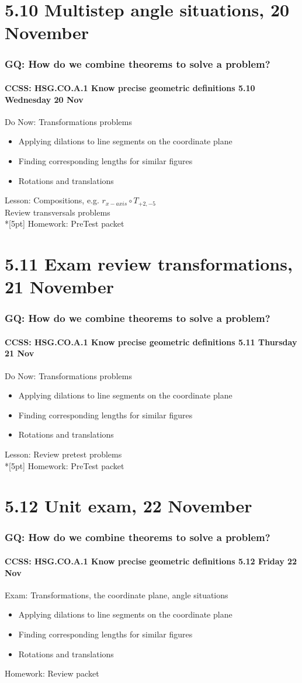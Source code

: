 \documentclass{beamer}
\begin{document}
\section{5.10 Multistep angle situations, 20 November}
\frame
{
  \frametitle{GQ: How do we combine theorems to solve a problem?}
  \framesubtitle{CCSS: HSG.CO.A.1 Know precise geometric definitions \hfill \alert{5.10 Wednesday 20 Nov}}

  \begin{block}{Do Now: Transformations problems}
  \begin{itemize}
    \item Applying dilations to line segments on the coordinate plane
    \item Finding corresponding lengths for similar figures
    \item Rotations and translations
  \end{itemize}
  \end{block}
  Lesson: Compositions, e.g. $r_{x-axis} \circ T_{+2,-5}$\\
  Review transversals problems \\*[5pt]
  Homework: PreTest packet 
}

\section{5.11 Exam review transformations, 21 November}
\frame
{
  \frametitle{GQ: How do we combine theorems to solve a problem?}
  \framesubtitle{CCSS: HSG.CO.A.1 Know precise geometric definitions \hfill \alert{5.11 Thursday 21 Nov}}

  \begin{block}{Do Now: Transformations problems}
  \begin{itemize}
    \item Applying dilations to line segments on the coordinate plane
    \item Finding corresponding lengths for similar figures
    \item Rotations and translations
  \end{itemize}
  \end{block}
  Lesson: Review pretest problems\\*[5pt]
  Homework: PreTest packet 
}

\section{5.12 Unit exam, 22 November}
\frame
{
  \frametitle{GQ: How do we combine theorems to solve a problem?}
  \framesubtitle{CCSS: HSG.CO.A.1 Know precise geometric definitions \hfill \alert{5.12 Friday 22 Nov}}

  \begin{block}{Exam: Transformations, the coordinate plane, angle situations}
  \begin{itemize}
    \item Applying dilations to line segments on the coordinate plane
    \item Finding corresponding lengths for similar figures
    \item Rotations and translations
  \end{itemize}
  \end{block}
  Homework: Review packet 
}
\end{document}
